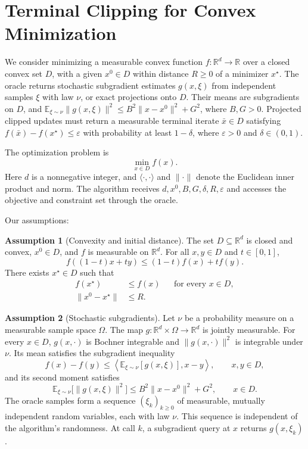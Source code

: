 \documentclass[10pt]{article}
\theoremstyle{definition}
\newtheorem{assumption}{Assumption}
\begin{document}
\section*{Terminal Clipping for Convex Minimization}
We consider minimizing a measurable convex function $f:\mathbb{R}^d\to\mathbb{R}$ over a closed convex set $D$, with a given $x^0\in D$ within distance $R\geq0$ of a minimizer $x^\star$. The oracle returns stochastic subgradient estimates $g(x,\xi)$ from independent samples $\xi$ with law $\nu$, or exact projections onto $D$. Their means are subgradients on $D$, and $\mathbb{E}_{\xi\sim\nu}\|g(x,\xi)\|^2\leq B^2\|x-x^0\|^2+G^2$, where $B,G>0$. Projected clipped updates must return a measurable terminal iterate $\bar{x}\in D$ satisfying $f(\bar{x})-f(x^\star)\leq\varepsilon$ with probability at least $1-\delta$, where $\varepsilon>0$ and $\delta\in(0,1)$.

The optimization problem is
\[
\min_{x\in D} f(x).
\]
Here $d$ is a nonnegative integer, and $\langle\cdot,\cdot\rangle$ and $\|\cdot\|$ denote the Euclidean inner product and norm. The algorithm receives $d,x^0,B,G,\delta,R,\varepsilon$ and accesses the objective and constraint set through the oracle.

Our assumptions:
\begin{assumption}[Convexity and initial distance]
The set $D\subseteq\mathbb{R}^d$ is closed and convex, $x^0\in D$, and $f$ is measurable on $\mathbb{R}^d$. For all $x,y\in D$ and $t\in[0,1]$,
\[
f((1-t)x+ty)\leq(1-t)f(x)+tf(y).
\]
There exists $x^\star\in D$ such that
\[
\begin{aligned}
f(x^\star)&\leq f(x) &&\text{for every }x\in D,\\
\|x^0-x^\star\|&\leq R.
\end{aligned}
\]
\end{assumption}

\begin{assumption}[Stochastic subgradients]
Let $\nu$ be a probability measure on a measurable sample space $\Omega$. The map $g:\mathbb{R}^d\times\Omega\to\mathbb{R}^d$ is jointly measurable. For every $x\in D$, $g(x,\cdot)$ is Bochner integrable and $\|g(x,\cdot)\|^2$ is integrable under $\nu$. Its mean satisfies the subgradient inequality
\[
f(x)-f(y)\leq
\left\langle\mathbb{E}_{\xi\sim\nu}[g(x,\xi)],x-y\right\rangle,
\qquad x,y\in D,
\]
and its second moment satisfies
\[
\mathbb{E}_{\xi\sim\nu}\bigl[\|g(x,\xi)\|^2\bigr]
\leq B^2\|x-x^0\|^2+G^2,
\qquad x\in D.
\]
The oracle samples form a sequence $(\xi_k)_{k\geq0}$ of measurable, mutually independent random variables, each with law $\nu$. This sequence is independent of the algorithm's randomness. At call $k$, a subgradient query at $x$ returns $g(x,\xi_k)$.
\end{assumption}
\end{document}
